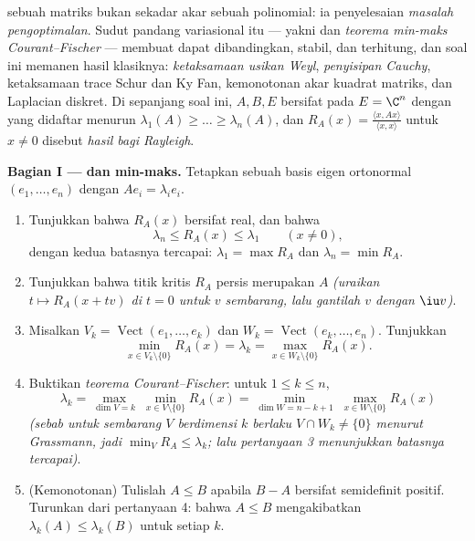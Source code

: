 \begin{problem}\label{pb:b2:hermitian:1}
 sebuah matriks  bukan sekadar akar sebuah
polinomial: ia penyelesaian \emph{masalah pengoptimalan}.
Sudut pandang variasional itu --- yakni  dan
\emph{teorema min-maks Courant--Fischer} --- membuat  dapat dibandingkan, stabil, dan
terhitung, dan soal ini memanen hasil klasiknya:
\emph{ketaksamaan usikan Weyl}, \emph{penyisipan Cauchy}, ketaksamaan trace Schur dan Ky Fan,
kemonotonan akar kuadrat matriks,
dan  Laplacian diskret. Di sepanjang soal ini, $A, B,
E$ bersifat  pada $E = \C^n$ dengan  yang didaftar
menurun $\lambda_1(A) \geq \dots \geq \lambda_n(A)$,
dan $R_A(x) = \frac{\langle x, Ax\rangle}{\langle x, x\rangle}$
untuk $x \neq 0$ disebut \emph{hasil bagi Rayleigh}.

\medskip
\noindent\textbf{Bagian I ---  dan min-maks.}
Tetapkan sebuah basis eigen ortonormal $(e_1, \dots, e_n)$ dengan $Ae_i =
\lambda_ie_i$.
\begin{enumerate}
  \item Tunjukkan bahwa $R_A(x)$ bersifat real, dan bahwa
        \[
        \lambda_n \leq R_A(x) \leq \lambda_1
        \qquad (x \neq 0),
        \]
        dengan kedua batasnya tercapai: $\lambda_1 = \max R_A$ dan
        $\lambda_n = \min R_A$.
  \item Tunjukkan bahwa titik kritis $R_A$ persis merupakan
         $A$ \emph{(uraikan $t \mapsto R_A(x +
        tv)$ di $t = 0$ untuk $v$ sembarang, lalu gantilah $v$ dengan
        $\iu v$)}.
  \item Misalkan $V_k = \operatorname{Vect}(e_1, \dots, e_k)$ dan
        $W_k = \operatorname{Vect}(e_k, \dots, e_n)$. Tunjukkan
        \[
        \min_{x \in V_k\setminus\{0\}} R_A(x) = \lambda_k
        = \max_{x \in W_k\setminus\{0\}} R_A(x) .
        \]
  \item Buktikan \emph{teorema Courant--Fischer}: untuk $1 \leq
        k \leq n$,
        \[
        \lambda_k = \max_{\dim V = k}\;\min_{x \in
        V\setminus\{0\}} R_A(x)
        = \min_{\dim W = n-k+1}\;\max_{x \in
        W\setminus\{0\}} R_A(x)
        \]
        \emph{(sebab untuk sembarang $V$ berdimensi $k$ berlaku $V \cap W_k \neq
        \{0\}$ menurut Grassmann, jadi $\min_V R_A \leq \lambda_k$;
        lalu pertanyaan 3 menunjukkan batasnya tercapai)}.
  \item (Kemonotonan) Tulislah $A \leq B$ apabila $B - A$ bersifat
        semidefinit positif. Turunkan dari pertanyaan 4: bahwa $A \leq
        B$ mengakibatkan $\lambda_k(A) \leq \lambda_k(B)$ untuk setiap
        $k$.
\end{enumerate}


\end{problem}
